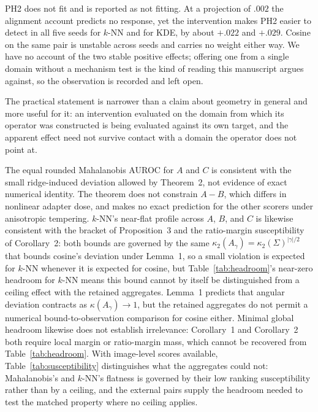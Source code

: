 \documentclass[pdflatex,sn-basic]{sn-jnl}
\theoremstyle{plain}
\theoremstyle{definition}
\theoremstyle{remark}
\begin{document}
PH2 does not fit and is reported as not fitting. At a projection of $.002$ the
alignment account predicts no response, yet the intervention makes PH2 easier
to detect in all five seeds for $k$-NN and for KDE, by about $+.022$ and
$+.029$. Cosine on the same pair is unstable across seeds and carries no weight
either way. We have no account of the two stable positive effects; offering one
from a single domain without a mechanism test is the kind of reading this
manuscript argues against, so the observation is recorded and left open.

The practical statement is narrower than a claim about geometry in general and
more useful for it: an intervention evaluated on the domain from which its
operator was constructed is being evaluated against its own target, and the
apparent effect need not survive contact with a domain the operator does not
point at.

The equal rounded Mahalanobis AUROC for $A$ and $C$ is consistent with the small ridge-induced deviation allowed by Theorem~2, not evidence of exact numerical identity. The theorem does not constrain $A-B$, which differs in nonlinear adapter dose, and makes no exact prediction for the other scorers under anisotropic tempering. $k$-NN's near-flat profile across $A$, $B$, and $C$ is likewise consistent with the bracket of Proposition~3 and the ratio-margin susceptibility of Corollary~2: both bounds are governed by the same $\kappa_2(A_\gamma)=\kappa_2(\Sigma)^{|\gamma|/2}$ that bounds cosine's deviation under Lemma~1, so a small violation is expected for $k$-NN whenever it is expected for cosine, but Table~\ref{tab:headroom}'s near-zero headroom for $k$-NN means this bound cannot by itself be distinguished from a ceiling effect with the retained aggregates. Lemma~1 predicts that angular deviation contracts as $\kappa(A_\gamma)\rightarrow1$, but the retained aggregates do not permit a numerical bound-to-observation comparison for cosine either. Minimal global headroom likewise does not establish irrelevance: Corollary~1 and Corollary~2 both require local margin or ratio-margin mass, which cannot be recovered from Table~\ref{tab:headroom}. With image-level scores available, Table~\ref{tab:susceptibility} distinguishes what the aggregates could not: Mahalanobis's and $k$-NN's flatness is governed by their low ranking susceptibility rather than by a ceiling, and the external pairs supply the headroom needed to test the matched property where no ceiling applies.
\end{document}
